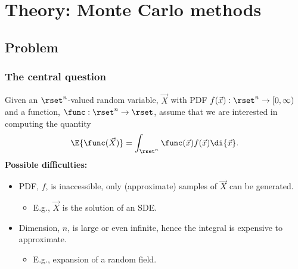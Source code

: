 {
\frame[noframenumbering]{\titlepage}
}
{
}

\section{Theory: Monte Carlo methods}
\subsection{Problem}
\begin{frame}\frametitle{The central question}
  Given an $\rset^n$-valued random variable, $\vec X$ with PDF
  $f(\vec x) : \rset^n \to [0,\infty)$ and a function,
  $\func : \rset^n \to \rset$, assume that we are interested in
  computing the quantity
\begin{equation*}\label{eq:expectation}
  \E{\func(\vec X)} = \int_{\rset^n} \func(\vec x) f(\vec x) \di{\vec x}.
\end{equation*}
\pause
\vskip 0.5cm \textbf{Possible difficulties:}
\begin{itemize}
\item PDF, $f$, is inaccessible, only (approximate) samples of $\vec X$ can be generated.
\begin{itemize}
\item E.g., $\vec X$ is the solution of an SDE.
\end{itemize}
\item Dimension, $n$, is large or even infinite, hence the integral is expensive to approximate.
\begin{itemize}
\item E.g., expansion of a random field.
\end{itemize}
\end{itemize}
\end{frame}

